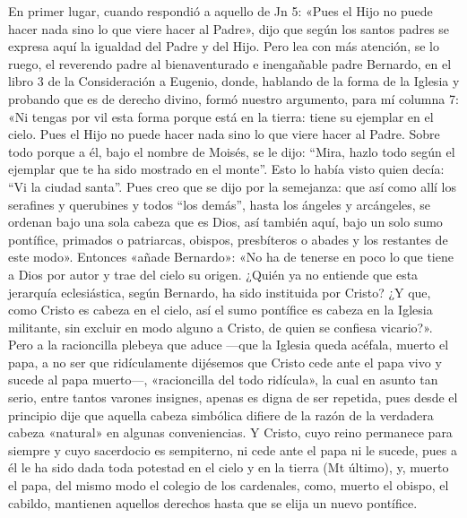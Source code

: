 En primer lugar, cuando respondió a aquello de Jn 5: «Pues el Hijo no puede hacer nada sino lo que viere hacer al Padre», dijo que según los santos padres se expresa aquí la igualdad del Padre y del Hijo. Pero lea con más atención, se lo ruego, el reverendo padre al bienaventurado e inengañable padre Bernardo, en el libro 3 de la Consideración a Eugenio, donde, hablando de la forma de la Iglesia y probando que es de derecho divino, formó nuestro argumento, para mí columna 7: «Ni tengas por vil esta forma porque está en la tierra: tiene su ejemplar en el cielo. Pues el Hijo no puede hacer nada sino lo que viere hacer al Padre. Sobre todo porque a él, bajo el nombre de Moisés, se le dijo: “Mira, hazlo todo según el ejemplar que te ha sido mostrado en el monte”. Esto lo había visto quien decía: “Vi la ciudad santa”. Pues creo que se dijo por la semejanza: que así como allí los serafines y querubines y todos “los demás”, hasta los ángeles y arcángeles, se ordenan bajo una sola cabeza que es Dios, así también aquí, bajo un solo sumo pontífice, primados o patriarcas, obispos, presbíteros o abades y los restantes de este modo». Entonces «añade Bernardo»: «No ha de tenerse en poco lo que tiene a Dios por autor y trae del cielo su origen. ¿Quién ya no entiende que esta jerarquía eclesiástica, según Bernardo, ha sido instituida por Cristo? ¿Y que, como Cristo es cabeza en el cielo, así el sumo pontífice es cabeza en la Iglesia militante, sin excluir en modo alguno a Cristo, de quien se confiesa vicario?». Pero a la racioncilla plebeya que aduce —que la Iglesia queda acéfala, \marginpar{\small[261]} muerto el papa, a no ser que ridículamente dijésemos que Cristo cede ante el papa vivo y sucede al papa muerto—, «racioncilla del todo ridícula», la cual en asunto tan serio, entre tantos varones insignes, apenas es digna de ser repetida, pues desde el principio dije que aquella cabeza simbólica difiere de la razón de la verdadera cabeza «natural» en algunas conveniencias. Y Cristo, cuyo reino permanece para siempre y cuyo sacerdocio es sempiterno, ni cede ante el papa ni le sucede, pues a él le ha sido dada toda potestad en el cielo y en la tierra (Mt último), y, muerto el papa, del mismo modo el colegio de los cardenales, como, muerto el obispo, el cabildo, mantienen aquellos derechos hasta que se elija un nuevo pontífice.

